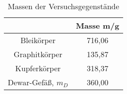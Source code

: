 \begin{table}[h]
	\begin{center}
		\begin{tabular}{cc}
			&Masse m/g \\ \hline
			Bleikörper&716,06\\
			Graphitkörper&135,87\\
			Kupferkörper&318,37\\
			Dewar-Gefäß, $m_D$&360,00
		\end{tabular}
		\caption{Massen der Versuchsgegenstände}
		\label{tabmassen}
	\end{center}
\end{table}